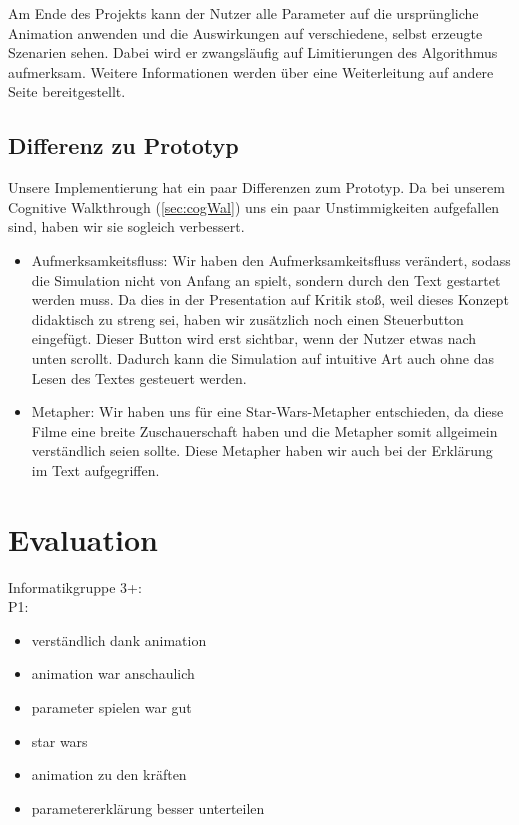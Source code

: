 Am Ende des Projekts kann der Nutzer alle Parameter auf die ursprüngliche Animation anwenden und die Auswirkungen auf verschiedene, selbst erzeugte Szenarien sehen. Dabei wird er zwangsläufig auf Limitierungen des Algorithmus aufmerksam. Weitere Informationen werden über eine Weiterleitung auf andere Seite bereitgestellt.

\subsection{Differenz zu Prototyp}
Unsere Implementierung hat ein paar Differenzen zum Prototyp.
Da bei unserem Cognitive Walkthrough (\vref{sec:cogWal}) uns ein paar Unstimmigkeiten aufgefallen sind, haben wir sie sogleich verbessert.
\begin{itemize}
	\item Aufmerksamkeitsfluss: Wir haben den Aufmerksamkeitsfluss verändert, sodass die Simulation nicht von Anfang an spielt, sondern durch den Text gestartet werden muss. Da dies in der Presentation auf Kritik stoß, weil dieses Konzept didaktisch zu streng sei, haben wir zusätzlich noch einen Steuerbutton eingefügt. Dieser Button wird erst sichtbar, wenn der Nutzer etwas nach unten scrollt. Dadurch kann die Simulation auf intuitive Art auch ohne das Lesen des Textes gesteuert werden.
	\item Metapher: Wir haben uns für eine Star-Wars-Metapher entschieden, da diese Filme eine breite Zuschauerschaft haben und die Metapher somit allgeimein verständlich seien sollte. Diese Metapher haben wir auch bei der Erklärung im Text aufgegriffen.
\end{itemize}

\section{Evaluation}
Informatikgruppe 3+: \\
P1:
\begin{itemize}
\item verständlich dank animation
\item animation war anschaulich
\item parameter spielen war gut
\item star wars
\item animation zu den kräften
\item parametererklärung besser unterteilen
\end{itemize}

